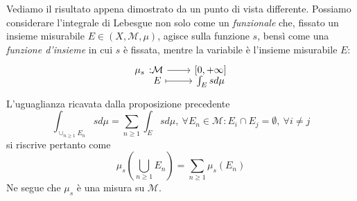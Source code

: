 Vediamo il risultato appena dimostrato da un punto di vista differente. Possiamo considerare l'integrale di Lebesgue non solo come un \textit{funzionale} che, fissato un insieme misurabile $E\in\left(X,\mathcal{M},\mu\right)$, agisce sulla funzione $s$, bensì come una \textit{funzione d'insieme} in cui $s$ è fissata, mentre la variabile è l'insieme misurabile $E$:
\begin{equation}
	\funztot{\mu_s}{\mathcal{M}}{\left[0,+\infty\right]}{E}{\int_Esd\mu}
\end{equation}
L'uguaglianza ricavata dalla proposizione precedente 
\begin{equation*}
	\int_{\cup_{n\geq 1}E_n}sd\mu=\sum_{n\geq 1}\int_{E}sd\mu,\ \forall E_n\in\mathcal{M}\colon E_i\cap E_j=\emptyset,\ \forall i\neq j
\end{equation*}
si riscrive pertanto come
\begin{equation*}
	\mu_s\left(\bigcup_{n\geq 1}E_n\right)=\sum_{n\geq 1}\mu_s\left(E_n\right)
\end{equation*}
Ne segue che $\mu_s$ è una misura su $\mathcal{M}$.
